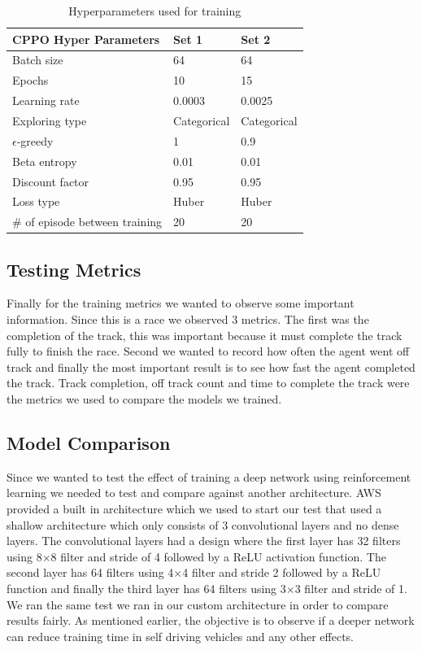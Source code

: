 \documentclass[journal]{IEEEtran}
\begin{document}
\begin{table}
\centering
\caption{Hyperparameters used for training}
\begin{tabular}{ | m{4cm} | m{4em}| m{4em} | } 
\hline
\textbf{CPPO Hyper Parameters} & \textbf{Set 1} & \textbf{Set 2} \\ 
\hline
Batch size & 64 & 64 \\ 
\hline
Epochs & 10 & 15 \\ 
\hline
Learning rate & 0.0003 & 0.0025 \\ 
\hline
Exploring type & Categorical & Categorical \\ 
\hline
$\epsilon$-greedy & 1 & 0.9 \\ 
\hline
Beta entropy & 0.01 & 0.01 \\ 
\hline
Discount factor & 0.95 & 0.95 \\ 
\hline
Loss type & Huber & Huber \\ 
\hline
\# of episode between training & 20 & 20 \\ 
\hline
\end{tabular}
\label{Hyperparameters}
\end{table}

\subsection{Testing Metrics}
Finally for the training metrics we wanted to observe some important information.  Since this is a race we observed 3 metrics.  The first was the completion of the track, this was important because it must complete the track fully to finish the race.  Second we wanted to record how often the agent went off track and finally the most important result is to see how fast the agent completed the track.  Track completion, off track count and time to complete the track were the metrics we used to compare the models we trained.

\subsection{Model Comparison}
Since we wanted to test the effect of training a deep network using reinforcement learning we needed to test and compare against another architecture.  AWS provided a built in architecture which we used to start our test that used a shallow architecture which only consists of 3 convolutional layers and no dense layers. The convolutional layers had a design where the first layer has 32 filters using 8$\times$8 filter and stride of 4 followed by a ReLU activation function.  The second layer has 64 filters using 4$\times$4 filter and stride 2 followed by a ReLU function and finally the third layer has 64 filters using 3$\times$3 filter and stride of 1.  We ran the same test we ran in our custom architecture in order to compare results fairly.  As mentioned earlier, the objective is to observe if a deeper network can reduce training time in self driving vehicles and any other effects.
\end{document}
